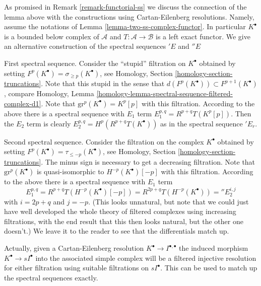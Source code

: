 \begin{remark}
\label{remark-final-functorial}
As promised in
Remark \ref{remark-functorial-ss}
we discuss the connection of the lemma
above with the constructions using Cartan-Eilenberg resolutions.
Namely, assume the notations of
Lemma \ref{lemma-two-ss-complex-functor}.
In particular $K^\bullet$ is a bounded below complex of
$\mathcal{A}$ and $T : \mathcal{A} \to \mathcal{B}$ is a
left exact functor. We give an alternative construction of the
spectral sequences ${}'E$ and ${}''E$

\medskip\noindent
First spectral sequence. Consider the ``stupid'' filtration
on $K^\bullet$
obtained by setting $F^p(K^\bullet) = \sigma_{\geq p}(K^\bullet)$, see
Homology, Section \ref{homology-section-truncations}.
Note that this stupid in the sense that
$d(F^p(K^\bullet)) \subset F^{p + 1}(K^\bullet)$, compare
Homology, Lemma \ref{homology-lemma-spectral-sequence-filtered-complex-d1}.
Note that $\text{gr}^p(K^\bullet) = K^p[p]$ with this filtration.
According to the above there is a spectral sequence
with $E_1$ term $E_1^{p, q} = R^{p + q}T(K^p[p])$.
Then the $E_2$ term is clearly $E_2^{p, q} = H^p(R^{p + q}T(K^\bullet))$
as in the spectral sequence ${}'E_r$.

\medskip\noindent
Second spectral sequence. Consider the filtration on the complex $K^\bullet$
obtained by setting $F^p(K^\bullet) = \tau_{\leq -p}(K^\bullet)$, see
Homology, Section \ref{homology-section-truncations}.
The minus sign is necessary
to get a decreasing filtration. Note that
$\text{gr}^p(K^\bullet)$ is quasi-isomorphic to $H^{-p}(K^\bullet)[-p]$
with this filtration. According to the above there is a spectral sequence
with $E_1$ term
$$
E_1^{p, q}
= R^{p + q}T(H^{-p}(K^\bullet)[-p])
= R^{2p + q}T(H^{-p}(K^\bullet)) = {}''E_2^{i, j}
$$
with $i = 2p + q$ and $j = -p$. (This looks unnatural, but note that we
could just have well developed the whole theory of filtered complexes
using increasing filtrations, with the end result that this then looks
natural, but the other one doesn't.) We leave it to the reader to see
that the differentials match up.

\medskip\noindent
Actually, given a Cartan-Eilenberg resolution
$K^\bullet \to I^{\bullet, \bullet}$ the induced morphism
$K^\bullet \to sI^\bullet$ into the associated simple complex
will be a filtered injective resolution for either filtration
using suitable filtrations on $sI^\bullet$. This can be used
to match up the spectral sequences exactly.
\end{remark}






